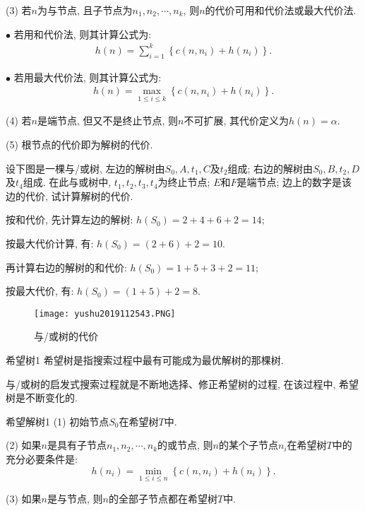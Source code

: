 (3) 若$n$为与节点, 且子节点为$n_1, n_2,\cdots,n_k$, 则$n$的代价可用和代价法或最大代价法.

    $\bullet$ 若用和代价法, 则其计算公式为:
    \begin{align}
        h(n)=\sum_{i=1}^{k}\left\{c\left(n, n_{i}\right)+h\left(n_{i}\right)\right\}.
    \end{align}

    $\bullet$ 若用最大代价法, 则其计算公式为:
    \begin{align}
        h(n)=\max _{1 \leq i \leq k}\left\{c\left(n, n_{i}\right)+h\left(n_{i}\right)\right\}.
    \end{align}

(4) 若$n$是端节点, 但又不是终止节点, 则$n$不可扩展, 其代价定义为$h(n)=\alpha$.

(5) 根节点的代价即为解树的代价.
\begin{example}
    设下图是一棵与/或树, 左边的解树由$S_0,A,t_1,C$及$t_2$组成; 右边的解树由$S_0,B,t_2,D$及$t_4$组成.
在此与或树中, $t_1,t_2,t_3,t_4$为终止节点; $E$和$F$是端节点; 边上的数字是该边的代价, 试计算解树的代价.
\end{example}
\begin{result}
按和代价, 先计算左边的解树: $h(S_0)=2+4+6+2=14$;

按最大代价计算, 有: $h(S_0)=(2+6)+2=10$.

再计算右边的解树的和代价: $h(S_0)=1+5+3+2=11$;

按最大代价, 有: $h(S_0)=(1+5)+2=8$.
\begin{figure}[H]
    \centering
    \texttt{[image: yushu2019112543.PNG]}
     \vspace{-0.5cm}
    \caption{与/或树的代价}
    \label{AI32fig43}
\end{figure}
\end{result}
\begin{mydef}{希望树}{1}
    希望树是指搜索过程中最有可能成为最优解树的那棵树.
\end{mydef}

与/或树的启发式搜索过程就是不断地选择、修正希望树的过程, 在该过程中, 希望树是不断变化的.
\begin{mydef}{希望解树}{1}
(1) 初始节点$S_0$在希望树$T$中.

(2) 如果$n$是具有子节点$n_1, n_2, \cdots, n_k$的或节点, 则$n$的某个子节点$n_i$在希望树$T$中的充分必要条件是:
     $$h\left(n_{i}\right)=\min _{1 \leq i \leq n}\left\{c\left(n, n_{i}\right)+h\left(n_{i}\right)\right\}.$$

(3) 如果$n$是与节点, 则$n$的全部子节点都在希望树$T$中.
\end{mydef}

